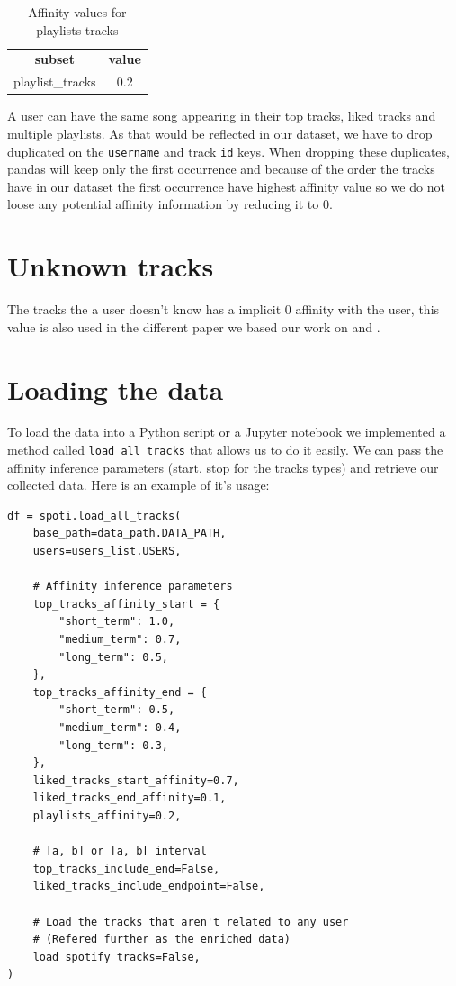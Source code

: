 \begin{table}[ht]
    \centering
    \begin{tabular}{c|c}
        \textbf{subset} & \textbf{value} \\
        playlist\_tracks & 0.2 \\
    \end{tabular}
    \caption{Affinity values for playlists tracks}
    \label{tab:playlists_tracks_values}
\end{table}

A user can have the same song appearing in their top tracks, liked tracks and multiple playlists. As that would be reflected in our dataset, we have to drop duplicated on the \texttt{username} and track \texttt{id} keys. When dropping these duplicates, pandas will keep only the first occurrence and because of the order the tracks have in our dataset the first occurrence have highest affinity value so we do not loose any potential affinity information by reducing it to 0.

\section{Unknown tracks}
The tracks the a user doesn't know has a implicit 0 affinity with the user, this value is also used in the different paper we based our work on \cite{johnson_logistic_matrix_factorization} and \cite{liang2018variational}.

\newpage

\section{Loading the data} \label{sec:loading_data}
To load the data into a Python script or a Jupyter notebook we implemented a method called \texttt{load\_all\_tracks} that allows us to do it easily. We can pass the affinity inference parameters (start, stop for the tracks types) and retrieve our collected data. Here is an example of it's usage:
\begin{lstlisting}
df = spoti.load_all_tracks(
    base_path=data_path.DATA_PATH,
    users=users_list.USERS,

    # Affinity inference parameters
    top_tracks_affinity_start = {
        "short_term": 1.0,
        "medium_term": 0.7,
        "long_term": 0.5,
    },
    top_tracks_affinity_end = {
        "short_term": 0.5,
        "medium_term": 0.4,
        "long_term": 0.3,
    },
    liked_tracks_start_affinity=0.7,
    liked_tracks_end_affinity=0.1,
    playlists_affinity=0.2,
    
    # [a, b] or [a, b[ interval
    top_tracks_include_end=False,
    liked_tracks_include_endpoint=False,

    # Load the tracks that aren't related to any user
    # (Refered further as the enriched data)
    load_spotify_tracks=False,
)
\end{lstlisting}



